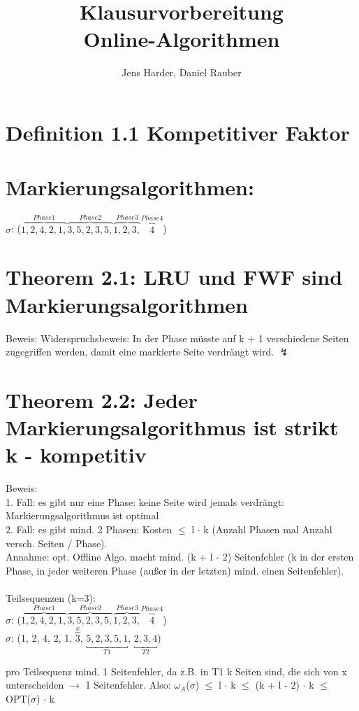 \documentclass[a4paper]{article}
\title{Klausurvorbereitung\\Online-Algorithmen}
\author{Jens Harder, Daniel Rauber}
\date{}
\begin{document}
\maketitle

\section*{Definition 1.1 Kompetitiver Faktor}

\section*{Markierungsalgorithmen:}
$\sigma$: ($\overbrace{1, 2, 4, 2, 1,}^{Phase 1}$$\overbrace{3, 5, 2, 3, 5,}^{Phase 2}$$\overbrace{1, 2, 3,}^{Phase 3}$$\overbrace{4}^{Phase 4}$)

\section*{Theorem 2.1: LRU und FWF sind Markierungsalgorithmen}
Beweis: Widerspruchsbeweis: In der Phase müsste auf k + 1 verschiedene Seiten zugegriffen werden, damit eine markierte Seite verdrängt wird. $\lightning$

\section*{Theorem 2.2: Jeder Markierungsalgorithmus ist strikt k - kompetitiv}
Beweis:\\
1. Fall: es gibt nur eine Phase: keine Seite wird jemals verdrängt: Markierungsalgorithmus ist optimal \\
2. Fall: es gibt mind. 2 Phasen: Kosten $\le$ l $\cdot$ k (Anzahl Phasen mal Anzahl versch. Seiten / Phase). \\
Annahme: opt. Offline Algo. macht mind. (k + l - 2) Seitenfehler (k in der ersten Phase, in jeder weiteren Phase (außer in der letzten) mind. einen Seitenfehler). \\
\\
Teilsequenzen (k=3):\\
$\sigma$: ($\overbrace{1, 2, 4, 2, 1,}^{Phase 1}$$\overbrace{3, 5, 2, 3, 5,}^{Phase 2}$$\overbrace{1, 2, 3,}^{Phase 3}$$\overbrace{4}^{Phase 4}$) \\
$\sigma$: (1, 2, 4, 2, 1, $\overbracket{3}^{x}$, $\underbracket{5, 2, 3, 5, 1}_{T1}$, $\underbracket{2, 3, 4}_{T2}$)

pro Teilsequenz mind. 1 Seitenfehler, da z.B. in T1 k Seiten sind, die sich von x unterscheiden $\to$ 1 Seitenfehler.
Also: $\omega_{A}$($\sigma$) $\le$ l $\cdot$ k $\le$ (k + l - 2) $\cdot$ k $\le$ OPT($\sigma$) $\cdot$ k
\end{document}
